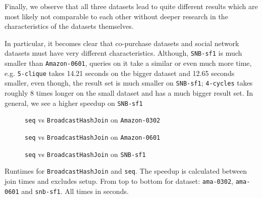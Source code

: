 
Finally, we observe that all three datasets lead to quite different results which are most likely not comparable to each other without deeper research
in the characteristics of the datasets themselves.

In particular, it becomes clear that co-purchase datasets and social network datasets must have very different characteristics.
Although, \texttt{SNB-sf1} is much smaller than \texttt{Amazon-0601}, queries on it take a similar or even much more time,
e.g. \texttt{5-clique} takes 14.21 seconds on the bigger dataset and 12.65 seconds smaller, even though, the result set is much
smaller on \texttt{SNB-sf1};
\texttt{4-cycles} takes roughly 8 times longer on the small dataset and has a much bigger result set.
In general, we see a higher speedup on \texttt{SNB-sf1}


\begin{figure}
    \centering
    
    \caption{\texttt{seq} vs \texttt{BroadcastHashJoin} on \texttt{Amazon-0302}}
    \label{fig:seq-bar-ama-0302}
\end{figure}

\begin{figure}
    \centering
    
    \caption{\texttt{seq} vs \texttt{BroadcastHashJoin} on \texttt{Amazon-0601}}
    \label{fig:seq-bar-ama-0601}
\end{figure}

\begin{figure}
    \centering
    
    \caption{\texttt{seq} vs \texttt{BroadcastHashJoin} on \texttt{SNB-sf1}}
    \label{fig:seq-bar-snb-sf1}
\end{figure}

\begin{table}
    \centering

    
    \vspace{0.3cm}

    

    \vspace{0.3cm}
    
    \caption{Runtimes for \texttt{BroadcastHashJoin} and \texttt{seq}.
    The speedup is calculated between join times and excludes setup.
    From top to bottom for dataset: \texttt{ama-0302}, \texttt{ama-0601} and \texttt{snb-sf1}.
    All times in seconds.
    }
    \label{table:seq-vs-bhj}
\end{table}

